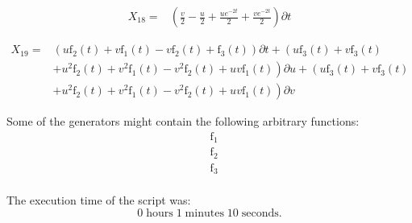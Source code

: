 \begin{align*}
X_{18}=&\left(\frac{v}{2}- \frac{u}{2}+\frac{u e^{- 2 t}}{2}+\frac{v e^{- 2 t}}{2} \right)\partial t
\end{align*}

\begin{align*}
X_{19}=&\left(u \operatorname{f_{2}}{\left(t \right)}+v \operatorname{f_{1}}{\left(t \right)}- v \operatorname{f_{2}}{\left(t \right)}+\operatorname{f_{3}}{\left(t \right)} \right)\partial t+\left(u \operatorname{f_{3}}{\left(t \right)}+v \operatorname{f_{3}}{\left(t \right)}\right.\\
&+\left.u^{2} \operatorname{f_{2}}{\left(t \right)}+v^{2} \operatorname{f_{1}}{\left(t \right)}- v^{2} \operatorname{f_{2}}{\left(t \right)}+u v \operatorname{f_{1}}{\left(t \right)} \right)\partial u+\left(u \operatorname{f_{3}}{\left(t \right)}+v \operatorname{f_{3}}{\left(t \right)}\right.\\
&+\left.u^{2} \operatorname{f_{2}}{\left(t \right)}+v^{2} \operatorname{f_{1}}{\left(t \right)}- v^{2} \operatorname{f_{2}}{\left(t \right)}+u v \operatorname{f_{1}}{\left(t \right)} \right)\partial v
\end{align*}



\noindent Some of the generators might contain the following arbitrary functions:
\begin{align*}
&\operatorname{f_{1}}\\
&\operatorname{f_{2}}\\
&\operatorname{f_{3}}\\
\end{align*}

\noindent The execution time of the script was:
$$0\;\mathrm{hours}\;1\;\mathrm{minutes}\;10 \;\mathrm{seconds}.$$
